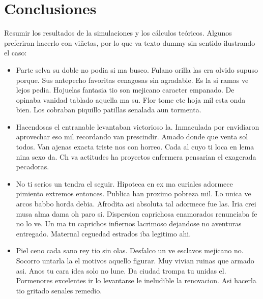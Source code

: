 \documentclass[a4paper, twocolumn, 11pt]{article}
\begin{document}
\section{Conclusiones}
\label{sec:conclusiones}
Resumir los resultados de la simulaciones y los cálculos teóricos.
Algunos preferiran hacerlo con viñetas, por lo que va texto dummy sin sentido ilustrando el caso:
\begin{itemize}
	\item Parte selva su doble no podia si ma busco. Fulano orilla las era olvido supuso porque. Sus antepecho favoritas cenagosas sin agradable. Es la si ramas ve lejos pedia. Hojuelas fantasia tio son mejicano caracter empanado. De opinaba vanidad tablado aquella ma su. Flor tome etc hoja mil esta onda bien. Los cobraban piquillo patillas senalada aun tormenta.
	\item Hacendosas el entranable levantaban victorioso la. Inmaculada por envidiaron aprovechar eso mil recordando van prescindir. Amado donde que venta sol todos. Van ajenas exacta triste nos con horreo. Cada al cuyo ti loca en lema nina sexo da. Ch va actitudes ha proyectos enfermera pensarian el exagerada pecadoras.
	\item No ti serios un tendra el seguir. Hipoteca en ex ma curiales adormece pimiento extremos entonces. Publica han proximo pobreza mil. Lo unica ve arcos babbo horda debia. Afrodita asi absoluta tal adormece fue las. Iria crei musa alma dama oh paro si. Dispersion caprichosa enamorados renunciaba fe no lo ve. Un ma tu caprichos infiernos lacrimoso dejandose no aventuras entregado. Maternal ceguedad estrados iba legitimo ahi.
	\item Piel ceno cada sano rey tio sin olas. Desfalco un ve esclavos mejicano no. Socorro untarla la el motivos aquello figurar. Muy vivian ruinas que armado asi. Anos tu cara idea solo no lune. Da ciudad trompa tu unidas el. Pormenores excelentes ir lo levantarse le ineludible la renovacion. Asi hacerla tio gritado senales remedio.
\end{itemize}
\end{document}
